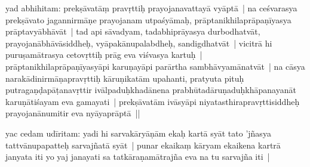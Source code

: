 \documentclass[article,12pt,a4paper]{memoir}
\begin{document}
	  \pstart yad abhihitam: \label{nk_3522_start}prekṣāvatāṃ pravṛttiḥ prayojanavattayā vyāptā | na ceśvarasya prekṣāvato jagannirmāṇe prayojanam utpaśyāmaḥ, prāptanikhilaprāpaṇīyasya prāptavyābhāvāt |\label{nk_3522_end} tad api sāvadyam, tadabhiprāyasya durbodhatvāt, prayojanābhāvāsiddheḥ, vyāpakānupalabdheḥ, sandigdhatvāt | vicitrā hi puruṣamātrasya cetovṛttiḥ prāg eva viśvasya kartuḥ | prāptanikhilaprāpaṇīyasyāpi karuṇayāpi parārtha sambhāvyamānatvāt | na cāsya narakādinirmāṇapravṛttiḥ kāruṇikatām upahanti, pratyuta pituḥ putragaṇḍapāṭanavṛttir ivālpaduḥkhadānena prabhūtadāruṇaduḥkhāpanayanāt karuṇātiśayam eva gamayati | prekṣāvatām ivāsyāpi niyatasthirapravṛttisiddheḥ prayojanānumitir eva nyāyaprāptā ||
	\pend
      

	  \pstart yac cedam udīritam: yadi hi sarvakāryāṇām ekaḥ kartā syāt tato 'jñasya tattvānupapatteḥ sarvajñatā syāt |  punar ekaikaṃ kāryam ekaikena kartrā \leavevmode{}\label{RNAms_20b} janyata iti yo yaj janayati sa tatkāraṇamātrajña eva na tu sarvajña iti |
	\pend
      
\end{document}
